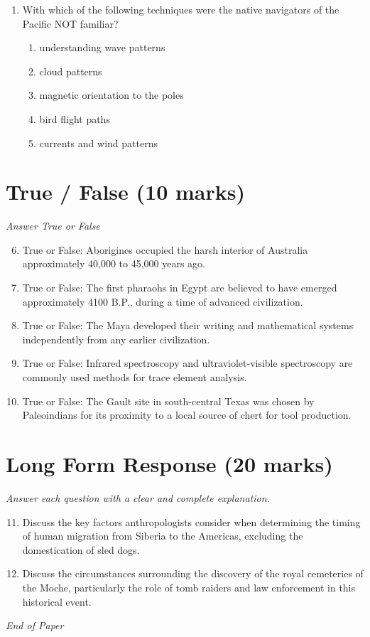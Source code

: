 \documentclass[12pt]{article}
\begin{document}
\begin{enumerate}[label=\arabic*.]
\begin{enumerate}[label=(\alph*)]
    \item invented the wheel.
    \item stored food surpluses in good years for distribution in bad years.
    \item established trade routes with distant cultures.
\end{enumerate}
\item With which of the following techniques were the native navigators of the Pacific NOT
familiar?
\begin{enumerate}[label=(\alph*)]
    \item understanding wave patterns
    \item cloud patterns
    \item magnetic orientation to the poles
    \item bird flight paths
    \item currents and wind patterns
\end{enumerate}
\end{enumerate}

\section*{True / False (10 marks)}
\textit{Answer True or False}
\begin{enumerate}[label=\arabic*.]
\setcounter{enumi}{5}
\item True or False: Aborigines occupied the harsh interior of Australia approximately 40,000 to 45,000 years ago.
\item True or False: The first pharaohs in Egypt are believed to have emerged approximately 4100 B.P., during a time of advanced civilization.
\item True or False: The Maya developed their writing and mathematical systems independently from any earlier civilization.
\item True or False: Infrared spectroscopy and ultraviolet-visible spectroscopy are commonly used methods for trace element analysis.
\item True or False: The Gault site in south-central Texas was chosen by Paleoindians for its proximity to a local source of chert for tool production.
\end{enumerate}

\section*{Long Form Response (20 marks)}
\textit{Answer each question with a clear and complete explanation.}
\begin{enumerate}[label=\arabic*.]
\setcounter{enumi}{10}
\item Discuss the key factors anthropologists consider when determining the timing of human
migration from Siberia to the Americas, excluding the domestication of sled dogs.
\item Discuss the circumstances surrounding the discovery of the royal cemeteries of the Moche,
particularly the role of tomb raiders and law enforcement in this historical event.
\end{enumerate}

\vfill
\noindent\textit{End of Paper}
\end{document}
